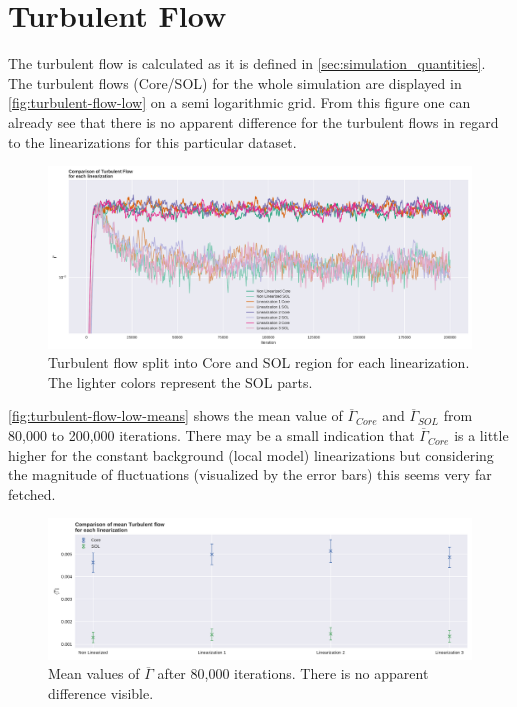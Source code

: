 \documentclass[master.tex]{subfiles}
\newcommand{\Tflow}[0]{\overline{\Gamma}}
\begin{document}
\section{Turbulent Flow}
The turbulent flow is calculated as it is defined in \autoref{sec:simulation_quantities}. The turbulent flows (Core/\ac{SOL}) for the whole simulation are displayed in \autoref{fig:turbulent-flow-low} on a semi logarithmic grid. From this figure one can already see that there is no apparent difference for the turbulent flows in regard to the linearizations for this particular dataset.
\begin{figure}[!htbp]
    \includegraphics[width=\linewidth]{pdfs/turbulent-flow-low.pdf}
    \caption{Turbulent flow split into Core and \ac{SOL} region for each linearization. The lighter colors represent the \ac{SOL} parts.}
    \label{fig:turbulent-flow-low}
\end{figure}
\autoref{fig:turbulent-flow-low-means} shows the mean value of $\Tflow_{Core}$ and $\Tflow_{SOL}$ from 80,000 to 200,000 iterations. There may be a small indication that $\Tflow_{Core}$ is a little higher for the constant background (local model) linearizations but considering the magnitude of fluctuations (visualized by the error bars) this seems very far fetched. 



\begin{figure}[!htbp]
    \includegraphics[width=\linewidth]{pdfs/turbulent-flow-low-means.pdf}
    \caption{Mean values of $\Tflow$ after 80,000 iterations. There is no apparent difference visible.}
    \label{fig:turbulent-flow-low-means}
\end{figure}
\end{document}
